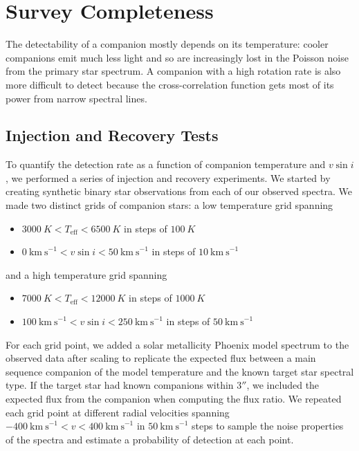 \section{Survey Completeness}
\label{paper6_sec:completeness}

The detectability of a companion mostly depends on its temperature: cooler companions emit much less light and so are increasingly lost in the Poisson noise from the primary star spectrum. A companion with a high rotation rate is also more difficult to detect because the cross-correlation function gets most of its power from narrow spectral lines.  

\subsection{Injection and Recovery Tests}

To quantify the detection rate as a function of companion temperature and $v\sin{i}$, we performed a series of injection and recovery experiments. We started by creating synthetic binary star observations from each of our observed spectra. We made two distinct grids of companion stars: a low temperature grid spanning

\begin{itemize}
\item $3000\ K < T_\mathrm{eff} < 6500\ K$ in steps of $100\ K$
\item $0\ \mathrm{km\ s}^{-1} < v\sin{i} < 50\ \mathrm{km\ s}^{-1}$ in steps of $10\ \mathrm{km\ s}^{-1}$
\end{itemize}
and a high temperature grid spanning

\begin{itemize}
\item $7000\ K < T_\mathrm{eff} < 12000\ K$ in steps of $1000\ K$
\item $100\ \mathrm{km\ s}^{-1} < v\sin{i} < 250\ \mathrm{km\ s}^{-1}$ in steps of $50\ \mathrm{km\ s}^{-1}$
\end{itemize}
For each grid point, we added a solar metallicity Phoenix model spectrum to the observed data after scaling to replicate the expected flux between a main sequence companion of the model temperature and the known target star spectral type. If the target star had known companions within $3''$, we included the expected flux from the companion when computing the flux ratio. We repeated each grid point at different radial velocities spanning $-400\ \mathrm{km\ s}^{-1} < v < 400\ \mathrm{km\ s}^{-1}$ in $50\ \mathrm{km\ s}^{-1}$ steps to sample the noise properties of the spectra and estimate a probability of detection at each point.

